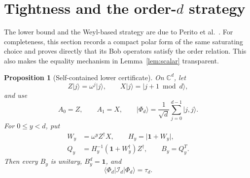 \documentclass[11pt]{article}
\newtheorem{proposition}[theorem]{Proposition}
\theoremstyle{remark}
\newcommand{\Id}{\mathbf 1}
\newcommand{\cI}{\mathcal I}
\newcommand{\bbC}{\mathbb C}
\newcommand{\absop}[1]{\lvert #1\rvert}
\begin{document}
\section{Tightness and the order-\(d\) strategy}

The lower bound and the Weyl-based strategy are due to Perito et
al.~\cite{PeritoEtAl2026}.  For completeness, this section records a compact
polar form of the same saturating choice and proves directly that its Bob
operators satisfy the order relation.  This also makes the equality mechanism
in Lemma~\ref{lem:scalar} transparent.

\begin{proposition}[Self-contained lower certificate]
\label{prop:lower}
On \(\bbC^d\), let
\[
  Z\lvert j\rangle=\omega^j\lvert j\rangle,
  \qquad
  X\lvert j\rangle=\lvert j+1\bmod d\rangle,
\]
and use
\[
  A_0=Z,\qquad A_1=X,\qquad
  \lvert\Phi_d\rangle
  =
  \frac1{\sqrt d}\sum_{j=0}^{d-1}\lvert j,j\rangle.
\]
For \(0\leq y<d\), put
\begin{align}
  W_y&=\omega^yZ^\dagger X,\qquad
  H_y=\absop{\Id+W_y},\label{eq:WH}\\
  Q_y&=H_y^{-1}(\Id+W_y^\dagger)Z^\dagger,\qquad
  B_y=Q_y^T. \label{eq:Bob}
\end{align}
Then every \(B_y\) is unitary, \(B_y^d=\Id\), and
\[
  \langle\Phi_d\vert\cI_d\vert\Phi_d\rangle=\tau_d.
\]
\end{proposition}
\end{document}
